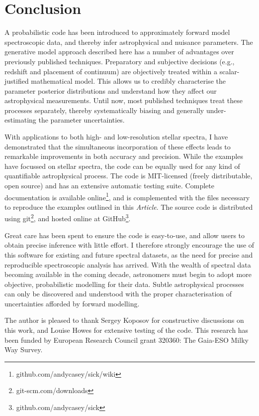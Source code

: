 \documentclass{aastex}
\newcommand{\article}{\textit{Article}}
\begin{document}


\section{Conclusion}

A probabilistic code has been introduced to approximately forward model spectroscopic data, and thereby infer astrophysical and nuisance parameters. The generative model approach described here has a number of advantages over previously published techniques. Preparatory and subjective decisions (e.g., redshift and placement of continuum) are objectively treated within a scalar-justified mathematical model. This allows us to credibly characterise the parameter posterior distributions and understand how they affect our astrophysical measurements. Until now, most published techniques treat these processes separately, thereby systematically biasing and generally under-estimating the parameter uncertainties.

With applications to both high- and low-resolution stellar spectra, I have demonstrated that the simultaneous incorporation of these effects leads to remarkable improvements in both accuracy and precision. While the examples have focussed on stellar spectra, the code can be equally used for any kind of quantifiable astrophysical process. The code is MIT-licensed (freely distributable, open source) and has an extensive automatic testing suite. Complete documentation is available online\footnote{github.com/andycasey/sick/wiki}, and is complemented with the files necessary to reproduce the examples outlined in this \article{}. The source code is distributed using git\footnote{git-scm.com/downloads}, and hosted online at GitHub\footnote{github.com/andycasey/sick}. 

Great care has been spent to ensure the code is easy-to-use, and allow users to obtain precise inference with little effort. I therefore strongly encourage the use of this software for existing and future spectral datasets, as the need for precise and reproducible spectroscopic analysis has arrived. With the wealth of spectral data becoming available in the coming decade, astronomers must begin to adopt more objective, probabilistic modelling for their data. Subtle astrophysical processes can only be discovered and understood with the proper characterisation of uncertainties afforded by forward modelling.

\acknowledgements
The author is pleased to thank Sergey Koposov for constructive discussions on this work, and Louise Howes for extensive testing of the code. This research has been funded by European Research Council grant 320360: The Gaia-ESO Milky Way Survey.
\end{document}
